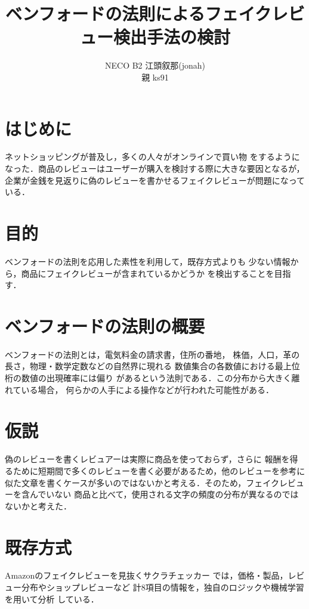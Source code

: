 \documentclass[a4paper, twocolumn]{jsarticle}
\begin{document}
\title{ベンフォードの法則によるフェイクレビュー検出手法の検討}
\author{
  NECO B2 江頭叙那(jonah)
  \\ 親 ks91 
}
\maketitle

\section{はじめに}

ネットショッピングが普及し，多くの人々がオンラインで買い物
をするようになった．商品のレビューはユーザーが購入を検討する際に大きな要因となるが，
企業が金銭を見返りに偽のレビューを書かせるフェイクレビューが問題になっている．

\section{目的}
ベンフォードの法則を応用した素性を利用して，既存方式よりも
少ない情報から，商品にフェイクレビューが含まれているかどうか
を検出することを目指す．

\section{ベンフォードの法則の概要}
ベンフォードの法則とは，電気料金の請求書，住所の番地，
株価，人口，革の長さ，物理・数学定数などの自然界に現れる
数値集合の各数値における最上位桁の数値の出現確率には偏り
があるという法則である．この分布から大きく離れている場合，
何らかの人手による操作などが行われた可能性がある．\cite{benford}

\section{仮説}
偽のレビューを書くレビュアーは実際に商品を使っておらず，さらに
報酬を得るために短期間で多くのレビューを書く必要があるため，他のレビューを参考に
似た文章を書くケースが多いのではないかと考える．そのため，フェイクレビューを含んでいない
商品と比べて，使用される文字の頻度の分布が異なるのではないかと考えた．


\section{既存方式}
Amazonのフェイクレビューを見抜くサクラチェッカー \cite{sakura}
では，価格・製品，レビュー分布やショップレビューなど
計8項目の情報を，独自のロジックや機械学習を用いて分析
している．
\end{document}
